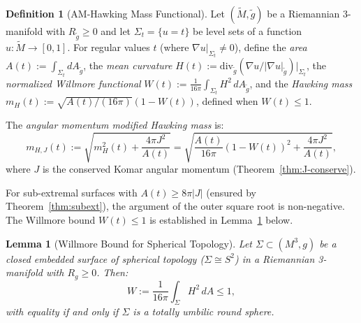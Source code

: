 \documentclass[12pt]{article}
\theoremstyle{plain}
\newtheorem{lemma}[theorem]{Lemma}
\theoremstyle{definition}
\newtheorem{definition}[theorem]{Definition}
\theoremstyle{remark}
\newcommand{\Div}{\mathrm{div}}
\newcommand{\tM}{\tilde{M}}
\newcommand{\tg}{\tilde{g}}
\begin{document}
\begin{definition}[AM-Hawking Mass Functional]\label{def:am-hawking}
Let $(\tM, \tg)$ be a Riemannian 3-manifold with $R_{\tg} \geq 0$ and let $\Sigma_t = \{u = t\}$ be level sets of a function $u: \tM \to [0,1]$. For regular values $t$ (where $\nabla u|_{\Sigma_t} \neq 0$), define the \emph{area} $A(t) := \int_{\Sigma_t} dA_{\tg}$, the \emph{mean curvature} $H(t) := \Div_{\tg}(\nabla u/|\nabla u|_{\tg})|_{\Sigma_t}$, the \emph{normalized Willmore functional} $W(t) := \frac{1}{16\pi}\int_{\Sigma_t} H^2 \, dA_{\tg}$, and the \emph{Hawking mass} $m_H(t) := \sqrt{A(t)/(16\pi)}(1 - W(t))$, defined when $W(t) \leq 1$.

The \emph{angular momentum modified Hawking mass} is:
\begin{equation}\label{eq:am-hawking}
m_{H,J}(t) := \sqrt{m_H^2(t) + \frac{4\pi J^2}{A(t)}} = \sqrt{\frac{A(t)}{16\pi}\left(1 - W(t)\right)^2 + \frac{4\pi J^2}{A(t)}},
\end{equation}
where $J$ is the conserved Komar angular momentum (Theorem~\ref{thm:J-conserve}).

For sub-extremal surfaces with $A(t) \geq 8\pi|J|$ (ensured by Theorem~\ref{thm:subext}), the argument of the outer square root is non-negative. The Willmore bound $W(t) \leq 1$ is established in Lemma~\ref{lem:willmore-bound} below.
\end{definition}

\begin{lemma}[Willmore Bound for Spherical Topology]\label{lem:willmore-bound}
Let $\Sigma \subset (M^3, g)$ be a closed embedded surface of spherical topology ($\Sigma \cong S^2$) in a Riemannian 3-manifold with $R_g \geq 0$. Then:
\begin{equation}\label{eq:willmore-bound}
W := \frac{1}{16\pi}\int_\Sigma H^2 \, dA \leq 1,
\end{equation}
with equality if and only if $\Sigma$ is a totally umbilic round sphere.
\end{lemma}
\end{document}
